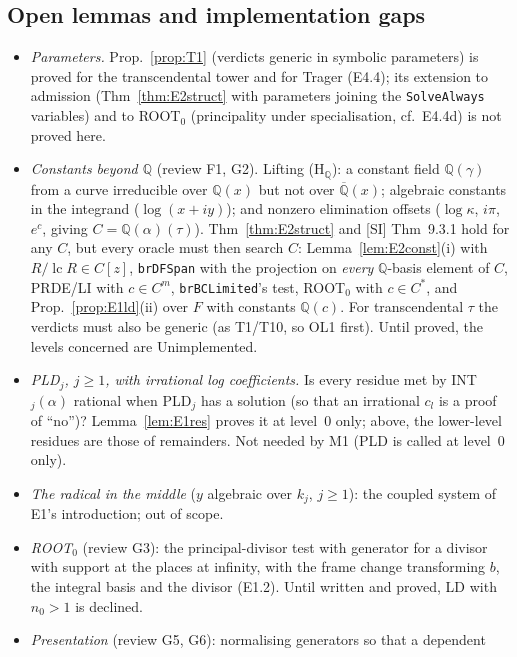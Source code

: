 \documentclass[11pt]{article}
\theoremstyle{definition}
\theoremstyle{remark}
\newcommand{\Q}{\mathbb{Q}}
\newcommand{\Qbar}{\overline{\mathbb{Q}}}
\newcommand{\lc}{\operatorname{lc}}
\newcommand{\code}[1]{\texttt{#1}}
\begin{document}
\subsection*{Open lemmas and implementation gaps}

\begin{itemize}
\item[OL1] \emph{Parameters.} Prop.~\ref{prop:T1} (verdicts generic in symbolic parameters)
  is proved for the transcendental tower and for Trager (E4.4); its extension to admission
  (Thm~\ref{thm:E2struct} with parameters joining the \code{SolveAlways} variables) and to
  ROOT$_0$ (principality under specialisation, cf.\ E4.4d) is not proved here.
\item[OL2] \emph{Constants beyond $\Q$} (review F1, G2). Lifting (H$_\Q$): a constant field
  $\Q(\gamma)$ from a curve irreducible over $\Q(x)$ but not over $\Qbar(x)$; algebraic constants
  in the integrand ($\log(x+iy)$); and nonzero elimination offsets ($\log\kappa$, $i\pi$,
  $e^c$, giving $C=\Q(\alpha)(\tau)$). Thm~\ref{thm:E2struct} and [SI] Thm~9.3.1 hold for any
  $C$, but every oracle must then search $C$: Lemma~\ref{lem:E2const}(i) with $R/\lc R\in C[z]$,
  \code{brDFSpan} with the projection on \emph{every} $\Q$-basis element of $C$, PRDE/LI with
  $c\in C^m$, \code{brBCLimited}'s test, ROOT$_0$ with $c\in C^*$, and Prop.~\ref{prop:E1ld}(ii)
  over $F$ with constants $\Q(c)$. For transcendental $\tau$ the verdicts must also be generic
  (as T1/T10, so OL1 first). Until proved, the levels concerned are Unimplemented.
\item[OL3] \emph{PLD$_j$, $j\ge1$, with irrational log coefficients.} Is every residue met by
  INT$_j(\alpha)$ rational when PLD$_j$ has a solution (so that an irrational $c_l$ is a proof of
  ``no'')? Lemma~\ref{lem:E1res} proves it at level~0 only; above, the lower-level residues are
  those of remainders. Not needed by M1 (PLD is called at level~0 only).
\item[OL4] \emph{The radical in the middle} ($y$ algebraic over $k_{j}$, $j\ge1$): the
  coupled system of E1's introduction; out of scope.
\item[OL5] \emph{ROOT$_0$} (review G3): the principal-divisor test with generator for a divisor
  with support at the places at infinity, with the frame change transforming $b$, the integral
  basis and the divisor (E1.2). Until written and proved, LD with $n_0>1$ is declined.
\item[OL6] \emph{Presentation} (review G5, G6): normalising generators so that a dependent

\end{itemize}
\end{document}
